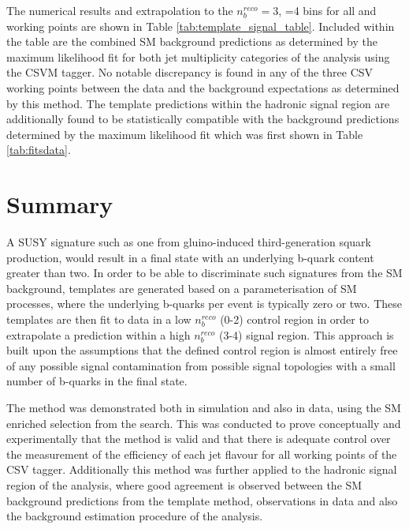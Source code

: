 The numerical results and extrapolation to the $n_{b}^{reco} =$3, =4 bins for all \theht and working points are shown in Table \ref{tab:template_signal_table}. Included within the table are the combined \ac{SM} background predictions as determined by the maximum likelihood fit for both jet multiplicity categories of the \alphat analysis using the \ac{CSVM} tagger. No notable discrepancy is found in any of the three \ac{CSV} working points between the data and the background
expectations as determined by this method. The template predictions within the hadronic signal region are additionally found to be statistically compatible with the background predictions determined by the \alphat maximum likelihood fit which was first shown in Table \ref{tab:fitsdata}.

\section{Summary}
\label{subsec:templateconclusions}

A \ac{SUSY} signature such as one from gluino-induced third-generation squark production, would result in a final state with an underlying b-quark content greater than two. In order to be able to discriminate such signatures from the \ac{SM} background, templates are generated based on a parameterisation of \ac{SM} processes, where the underlying b-quarks per event is typically zero or two. These templates are then fit to data in a low $n_{b}^{reco}$ (0-2) control region in order to
extrapolate a prediction within a high $n_{b}^{reco}$ (3-4) signal region. This approach is built upon the assumptions that the defined control region is almost entirely free of any possible signal contamination from possible signal topologies with a small number of b-quarks in the final state.

The method was demonstrated both in simulation and also in data, using the \ac{SM} enriched \mupjets selection from the \alphat search. This was conducted to prove conceptually and experimentally that the method is valid and that there is adequate control over the measurement of the efficiency of each jet flavour for all working points of the \ac{CSV} tagger. Additionally this method was further applied to the hadronic signal region of the \alphat analysis, where good agreement is observed between the \ac{SM} background predictions from the template method, observations in data and also the background estimation procedure of the \alphat analysis.

